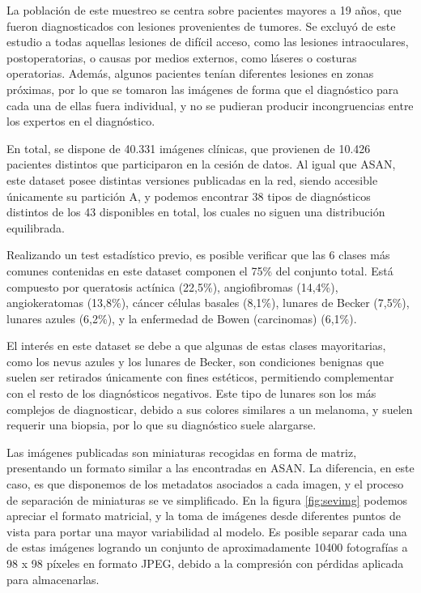 La población de este muestreo se centra sobre pacientes mayores a 19 años, que fueron diagnosticados con lesiones provenientes de tumores. Se excluyó de este estudio a todas aquellas lesiones de difícil acceso, como las lesiones intraoculares, postoperatorias, o causas por medios externos, como láseres o costuras operatorias. Además, algunos pacientes tenían diferentes lesiones en zonas próximas, por lo que se tomaron las imágenes de forma que el diagnóstico para cada una de ellas fuera individual, y no se pudieran producir incongruencias entre los expertos en el diagnóstico. 

En total, se dispone de 40.331 imágenes clínicas, que provienen de 10.426 pacientes distintos que participaron en la cesión de datos. Al igual que ASAN, este dataset posee distintas versiones publicadas en la red, siendo accesible únicamente su partición A, y podemos encontrar 38 tipos de diagnósticos distintos de los 43 disponibles en total,  los cuales no siguen una distribución equilibrada.

Realizando un test estadístico previo, es posible verificar que las 6 clases más comunes contenidas en este dataset componen el 75\% del conjunto total. Está compuesto por queratosis actínica (22,5\%), angiofibromas (14,4\%), angiokeratomas (13,8\%), cáncer células basales (8,1\%), lunares de Becker (7,5\%), lunares azules (6,2\%), y la enfermedad de Bowen (carcinomas) (6,1\%).

El interés en este dataset se debe a que algunas de estas clases mayoritarias, como los nevus azules y los lunares de Becker, son condiciones benignas que suelen ser retirados únicamente con fines estéticos, permitiendo complementar con el resto de los diagnósticos negativos. Este tipo de lunares son los más complejos de diagnosticar, debido a sus colores similares a un melanoma, y suelen requerir una biopsia, por lo que su diagnóstico suele alargarse.

Las imágenes publicadas son miniaturas recogidas en forma de matriz, presentando un formato similar a las encontradas en ASAN. La diferencia, en este caso, es que disponemos de los metadatos asociados a cada imagen, y el proceso de separación de miniaturas se ve simplificado. En la figura \ref{fig:sevimg} podemos apreciar el formato matricial, y la toma de imágenes desde diferentes puntos de vista para portar una mayor variabilidad al modelo. Es posible separar cada una de estas imágenes logrando un conjunto de aproximadamente 10400 fotografías a 98 x 98 píxeles en formato JPEG, debido a la compresión con pérdidas aplicada para almacenarlas.

